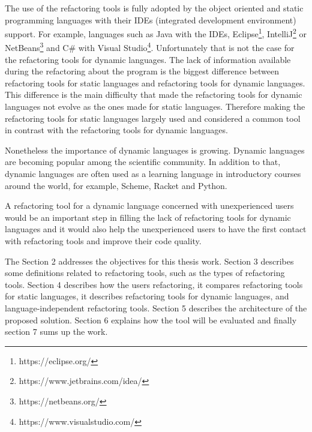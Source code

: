 The use of the refactoring tools is fully adopted by the object oriented and static programming languages with their IDEs (integrated development environment) support.
For example, languages such as Java with the IDEs, Eclipse\footnote{https://eclipse.org/}, IntelliJ\footnote{https://www.jetbrains.com/idea/} or NetBeans\footnote{https://netbeans.org/} and C\# with Visual Studio\footnote{https://www.visualstudio.com/}.
Unfortunately that is not the case for the refactoring tools for dynamic languages. 
The lack of information available during the refactoring about the program is the biggest difference between refactoring tools for static languages and refactoring tools for dynamic languages.
This difference is the main difficulty that made the refactoring tools for dynamic languages not evolve as the ones made for static languages. 
Therefore making the refactoring tools for static languages largely used and considered a common tool in contrast with the refactoring tools for dynamic languages.  %

Nonetheless the importance of dynamic languages is growing. Dynamic languages are becoming popular among the scientific community.
In addition to that, dynamic languages are often used as a learning language in introductory courses around the world, for example, Scheme, Racket and Python.

A refactoring tool for a dynamic language concerned with unexperienced users would be an important step in filling the lack of refactoring tools for dynamic languages and it would also help the unexperienced users to have the first contact with refactoring tools and improve their code quality.



The Section 2 addresses the objectives for this thesis work. 
Section 3 describes some definitions related to refactoring tools, such as the types of refactoring tools.
Section 4 describes how the users refactoring, it compares refactoring tools for static languages, it describes refactoring tools for dynamic languages, and language-independent refactoring tools.
Section 5 describes the architecture of the proposed solution. 
Section 6 explains how the tool will be evaluated and finally section 7 sums up the work.






